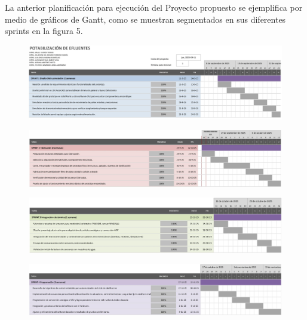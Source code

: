\documentclass[conference]{IEEEtran}
\begin{document}
		\vspace{1em}
		
	La anterior planificación para ejecución del Proyecto propuesto se ejemplifica por medio de gráficos de Gantt, como se muestran segmentados en sus diferentes sprints en la figura 5.
	
		
	
	\begin{figure}[htbp]
	\centering
	\includegraphics[width=\columnwidth]{fig5_1.jpg}
	\end{figure}
	
	\begin{figure}[htbp]
	\centering
	\includegraphics[width=\columnwidth]{fig5_2.jpg}
	\end{figure}
	
	\begin{figure}[htbp]
	\centering
	\includegraphics[width=\columnwidth]{fig5_3.jpg}
	\end{figure}

	\begin{figure}[!htbp]
	\centering
	\includegraphics[width=\columnwidth]{fig5_4.jpg}
	\end{figure}
\end{document}
